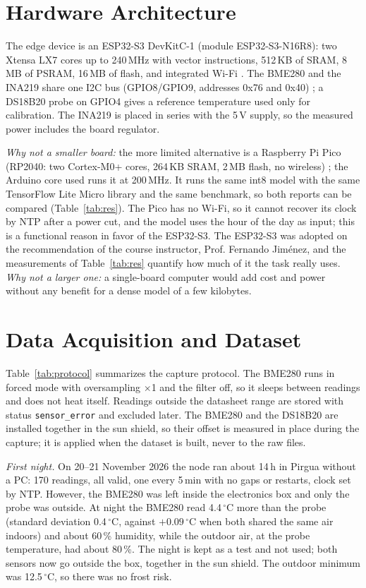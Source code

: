 \documentclass[conference]{IEEEtran}
\begin{document}
\section{Hardware Architecture}
The edge device is an ESP32-S3 DevKitC-1 (module ESP32-S3-N16R8): two Xtensa LX7 cores up to 240\,MHz with vector instructions, 512\,KB of SRAM, 8\,MB of PSRAM, 16\,MB of flash, and integrated Wi-Fi \cite{esp32s3}. The BME280 and the INA219 share one I2C bus (GPIO8/GPIO9, addresses 0x76 and 0x40) \cite{bme280}; a DS18B20 probe on GPIO4 gives a reference temperature used only for calibration. The INA219 is placed in series with the 5\,V supply, so the measured power includes the board regulator.

\textit{Why not a smaller board:} the more limited alternative is a Raspberry Pi Pico (RP2040: two Cortex-M0+ cores, 264\,KB SRAM, 2\,MB flash, no wireless) \cite{rp2040}; the Arduino core used runs it at 200\,MHz. It runs the same int8 model with the same TensorFlow Lite Micro library and the same benchmark, so both reports can be compared (Table~\ref{tab:res}). The Pico has no Wi-Fi, so it cannot recover its clock by NTP after a power cut, and the model uses the hour of the day as input; this is a functional reason in favor of the ESP32-S3. The ESP32-S3 was adopted on the recommendation of the course instructor, Prof. Fernando Jim\'enez, and the measurements of Table~\ref{tab:res} quantify how much of it the task really uses. \textit{Why not a larger one:} a single-board computer would add cost and power without any benefit for a dense model of a few kilobytes.

\section{Data Acquisition and Dataset}
Table~\ref{tab:protocol} summarizes the capture protocol. The BME280 runs in forced mode with oversampling $\times$1 and the filter off, so it sleeps between readings and does not heat itself. Readings outside the datasheet range are stored with status \texttt{sensor\_error} and excluded later. The BME280 and the DS18B20 are installed together in the sun shield, so their offset is measured in place during the capture; it is applied when the dataset is built, never to the raw files.

\textit{First night.} On 20--21 November 2026 the node ran about 14\,h in Pirgua without a PC: 170 readings, all valid, one every 5\,min with no gaps or restarts, clock set by NTP. However, the BME280 was left inside the electronics box and only the probe was outside. At night the BME280 read 4.4\,$^\circ$C more than the probe (standard deviation 0.4\,$^\circ$C, against $+0.09$\,$^\circ$C when both shared the same air indoors) and about 60\,\% humidity, while the outdoor air, at the probe temperature, had about 80\,\%. The night is kept as a test and not used; both sensors now go outside the box, together in the sun shield. The outdoor minimum was 12.5\,$^\circ$C, so there was no frost risk.
\end{document}
